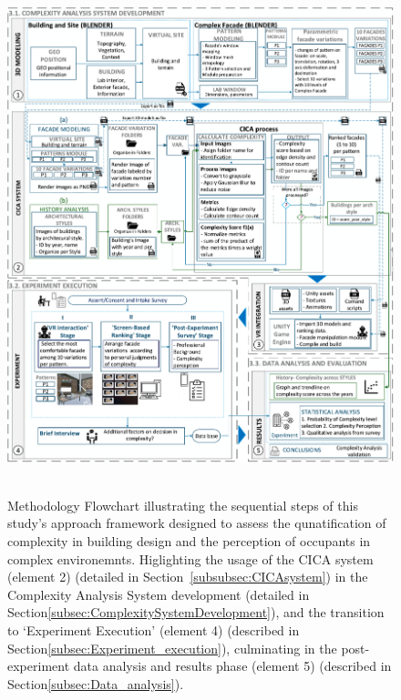 \documentclass[final,5p,times]{elsarticle}%
\begin{document}
\begin{linenumbers}
    \begin{figure}[!htb]
        \centering
        \includegraphics[width=\linewidth]{Images/MethodologyFlowchart}~\caption{Methodology Flowchart illustrating the sequential steps of this study's approach framework designed to assess the qunatification of complexity in building design and the perception of occupants in complex environemnts. Higlighting the usage of the CICA system (element 2) (detailed in Section~\ref{subsubsec:CICAsystem}) in the Complexity Analysis System development (detailed in Section\ref{subsec:ComplexitySystemDevelopment}), and the transition to `Experiment Execution' (element 4) (described in Section\ref{subsec:Experiment_execution}), culminating in the post-experiment data analysis and results phase (element 5) (described in Section\ref{subsec:Data_analysis}).}
          \label{fig:MethodologyFlowchart}
    \end{figure}


\end{linenumbers}
\end{document}
